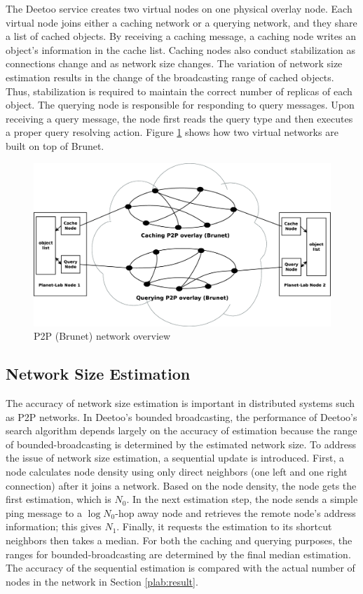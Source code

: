 \documentclass[9.5pt,journal,final,finalsubmission,twocolumn]{IEEEtran}
\begin{document}
The Deetoo service creates two virtual nodes on one physical overlay node.
Each virtual node joins either a caching network or a querying network, 
and they share a list of cached objects.
By receiving a caching message, a caching node writes an object's 
information
in the cache list.
Caching nodes also conduct stabilization as connections change and as 
network size changes. 
The variation of network size estimation results in the change of 
the broadcasting range of cached objects. Thus, 
stabilization is required to maintain the correct number of replicas of each object.
The querying node is responsible for responding to query messages. 
Upon receiving a query message, the node first reads the query type and
then executes a proper query resolving action.
Figure \ref{fig:brunet} shows how two virtual networks are built on top of 
Brunet.
\begin{figure}
\centering
\includegraphics[width=5.5in]{brunet.eps}
\caption{P2P (Brunet) network overview} \label{fig:brunet}
\end{figure}

\subsection{Network Size Estimation}
The accuracy of network size estimation is important in distributed systems
such as P2P networks. In Deetoo's bounded broadcasting,
the performance of Deetoo's search algorithm depends largely on the 
accuracy of estimation because the range of bounded-broadcasting is 
determined by the estimated network size. 
To address the issue of network size estimation, a sequential update is 
introduced. First, a node calculates node density using only direct 
neighbors (one left and one right connection) after it joins a network. 
Based on the node density, the node gets the first estimation, which is 
$N_0$.
In the next estimation step, the node sends a simple ping message
to a $\log{N_0}$-hop away node and retrieves the remote node's address 
information; this gives $N_1$. 
Finally, it requests the estimation to its shortcut
neighbors then takes a median. For both the caching and querying purposes, 
the ranges for bounded-broadcasting are determined by the final median 
estimation. The accuracy of the sequential estimation is compared with the 
actual number of nodes in the network in 
Section \ref{plab:result}.
\end{document}

